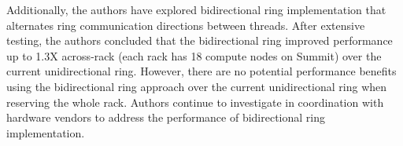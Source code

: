 Additionally, the authors have explored bidirectional ring implementation 
that alternates ring communication directions between threads. 
%
After extensive testing, the authors concluded that the 
bidirectional ring improved performance up to 1.3X across-rack 
(each rack has 18 compute nodes on Summit) over the current unidirectional ring.
%
However, there are no potential performance benefits using the bidirectional ring approach over the current unidirectional ring when reserving the whole rack. 
%
Authors continue to investigate in coordination with hardware vendors to address the performance of bidirectional ring implementation.
